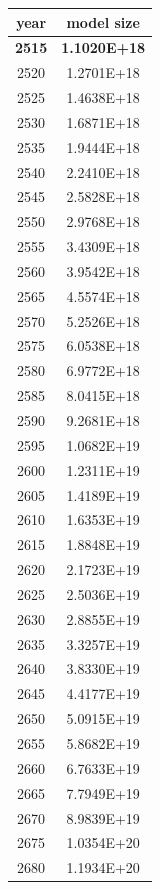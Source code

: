 \documentclass[a4paper]{article}
\begin{document}
    \begin{tabular}{| c | c |}
    	\hline
    	year & model size \\\hline
    	\textbf{2515} & \textbf{1.1020E+18} \\\hline
    	2520 & 1.2701E+18 \\\hline
    	2525 & 1.4638E+18 \\\hline
    	2530 & 1.6871E+18 \\\hline
    	2535 & 1.9444E+18 \\\hline
    	2540 & 2.2410E+18 \\\hline
    	2545 & 2.5828E+18 \\\hline
    	2550 & 2.9768E+18 \\\hline
    	2555 & 3.4309E+18 \\\hline
    	2560 & 3.9542E+18 \\\hline
    	2565 & 4.5574E+18 \\\hline
    	2570 & 5.2526E+18 \\\hline
    	2575 & 6.0538E+18 \\\hline
    	2580 & 6.9772E+18 \\\hline
    	2585 & 8.0415E+18 \\\hline
    	2590 & 9.2681E+18 \\\hline
    	2595 & 1.0682E+19 \\\hline
    	2600 & 1.2311E+19 \\\hline
    	2605 & 1.4189E+19 \\\hline
    	2610 & 1.6353E+19 \\\hline
    	2615 & 1.8848E+19 \\\hline
    	2620 & 2.1723E+19 \\\hline
    	2625 & 2.5036E+19 \\\hline
    	2630 & 2.8855E+19 \\\hline
    	2635 & 3.3257E+19 \\\hline
    	2640 & 3.8330E+19 \\\hline
    	2645 & 4.4177E+19 \\\hline
    	2650 & 5.0915E+19 \\\hline
    	2655 & 5.8682E+19 \\\hline
    	2660 & 6.7633E+19 \\\hline
    	2665 & 7.7949E+19 \\\hline
    	2670 & 8.9839E+19 \\\hline
    	2675 & 1.0354E+20 \\\hline
    	2680 & 1.1934E+20 \\\hline

\end{tabular}
\end{document}
